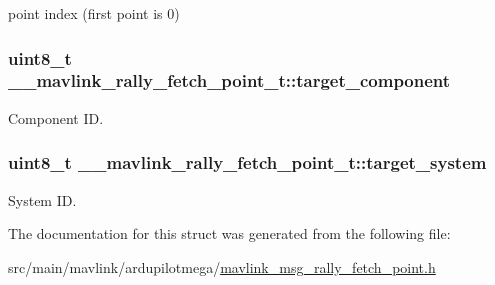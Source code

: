 point index (first point is 0) 

\hypertarget{struct____mavlink__rally__fetch__point__t_aadf1ea321c39310b8cf79ffd128f6cef}{
\subsubsection[{target\+\_\+component}]{\setlength{\rightskip}{0pt plus 5cm}uint8\+\_\+t \+\_\+\+\_\+mavlink\+\_\+rally\+\_\+fetch\+\_\+point\+\_\+t\+::target\+\_\+component}}\label{struct____mavlink__rally__fetch__point__t_aadf1ea321c39310b8cf79ffd128f6cef}


Component I\+D. 

\hypertarget{struct____mavlink__rally__fetch__point__t_aff0edbe04a82279086868d333e57b36c}{
\subsubsection[{target\+\_\+system}]{\setlength{\rightskip}{0pt plus 5cm}uint8\+\_\+t \+\_\+\+\_\+mavlink\+\_\+rally\+\_\+fetch\+\_\+point\+\_\+t\+::target\+\_\+system}}\label{struct____mavlink__rally__fetch__point__t_aff0edbe04a82279086868d333e57b36c}


System I\+D. 



The documentation for this struct was generated from the following file\+:\begin{DoxyCompactItemize}
\item 
src/main/mavlink/ardupilotmega/\hyperlink{mavlink__msg__rally__fetch__point_8h}{mavlink\+\_\+msg\+\_\+rally\+\_\+fetch\+\_\+point.\+h}\end{DoxyCompactItemize}
